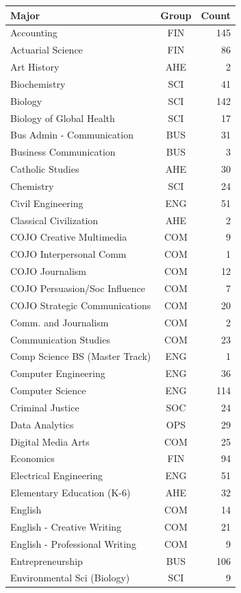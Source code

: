 \documentclass[
  11pt,
  letterpaper,
]{report}
\begin{document}
\begin{longtable}[]{@{}lcr@{}}
\toprule\noalign{}
Major & Group & Count \\
\midrule\noalign{}
\endhead
\bottomrule\noalign{}
\endlastfoot
Accounting & FIN & 145 \\
Actuarial Science & FIN & 86 \\
Art History & AHE & 2 \\
Biochemistry & SCI & 41 \\
Biology & SCI & 142 \\
Biology of Global Health & SCI & 17 \\
Bus Admin - Communication & BUS & 31 \\
Business Communication & BUS & 3 \\
Catholic Studies & AHE & 30 \\
Chemistry & SCI & 24 \\
Civil Engineering & ENG & 51 \\
Classical Civilization & AHE & 2 \\
COJO Creative Multimedia & COM & 9 \\
COJO Interpersonal Comm & COM & 1 \\
COJO Journalism & COM & 12 \\
COJO Persuasion/Soc Influence & COM & 7 \\
COJO Strategic Communications & COM & 20 \\
Comm. and Journalism & COM & 2 \\
Communication Studies & COM & 23 \\
Comp Science BS (Master Track) & ENG & 1 \\
Computer Engineering & ENG & 36 \\
Computer Science & ENG & 114 \\
Criminal Justice & SOC & 24 \\
Data Analytics & OPS & 29 \\
Digital Media Arts & COM & 25 \\
Economics & FIN & 94 \\
Electrical Engineering & ENG & 51 \\
Elementary Education (K-6) & AHE & 32 \\
English & COM & 14 \\
English - Creative Writing & COM & 21 \\
English - Professional Writing & COM & 9 \\
Entrepreneurship & BUS & 106 \\
Environmental Sci (Biology) & SCI & 9 \\

\end{longtable}
\end{document}
